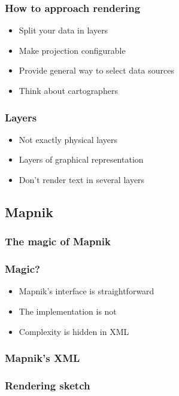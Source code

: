 \documentclass[14pt]{beamer}
\begin{document}
\begin{frame}
  \frametitle{How to approach rendering}
  \begin{itemize}
  \item Split your data in layers
  \item Make projection configurable
  \item Provide general way to select data sources
  \item Think about cartographers
  \end{itemize}
\end{frame}

\begin{frame}
  \frametitle{Layers}
  \begin{itemize}
  \item Not exactly physical layers
  \item Layers of graphical representation
  \item Don't render text in several layers
  \end{itemize}
\end{frame}

\subsection{Mapnik}

\begin{frame}
  \frametitle{The magic of Mapnik}
  
\end{frame}

\begin{frame}
  \frametitle{Magic?}
  \begin{itemize}
  \item Mapnik's interface is straightforward
  \item The implementation is not
  \item Complexity is hidden in XML
  \end{itemize}
\end{frame}

\begin{frame}
  \frametitle{Mapnik's XML}
\end{frame}


\begin{frame}
  \frametitle{Rendering sketch}
\end{frame}
\end{document}
